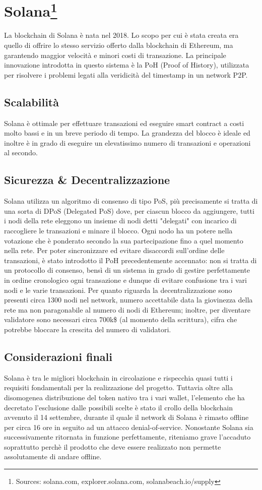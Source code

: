 \documentclass[a4paper, 12pt]{article}
\begin{document}
\newpage
\section*{Solana\footnote{Sources: solana.com, explorer.solana.com, solanabeach.io/supply}}
La blockchain di Solana è nata nel 2018. Lo scopo per cui è stata creata era quello di offrire lo stesso servizio offerto dalla blockchain di Ethereum, ma garantendo maggior velocità e minori costi di transazione. La principale innovazione introdotta in questo sistema è la PoH (Proof of History), utilizzata per risolvere i problemi legati alla veridicità del timestamp in un network P2P.
\subsection*{Scalabilità}
Solana è ottimale per effettuare transazioni ed eseguire smart contract a costi molto bassi e in un breve periodo di tempo. La grandezza del blocco è ideale ed inoltre è in grado di eseguire un elevatissimo numero di transazioni e operazioni al secondo.
\subsection*{Sicurezza \& Decentralizzazione}
Solana utilizza un algoritmo di consenso di tipo PoS, più precisamente si tratta di una sorta di DPoS (Delegated PoS) dove, per ciascun blocco da aggiungere, tutti i nodi della rete eleggono un insieme di nodi detti "delegati" con incarico di raccogliere le transazioni e minare il blocco. Ogni nodo ha un potere nella votazione che è ponderato secondo la sua partecipazione fino a quel momento nella rete. Per poter sincronizzare ed evitare disaccordi sull'ordine delle transazioni, è stato introdotto il PoH precedentemente accennato: non si tratta di un protocollo di consenso, bensì di un sistema in grado di gestire perfettamente in ordine cronologico ogni transazione e dunque di evitare confusione tra i vari nodi e le varie transazioni. Per quanto riguarda la decentralizzazione sono presenti circa 1300 nodi nel network, numero accettabile data la giovinezza della rete ma non paragonabile al numero di nodi di Ethereum; inoltre, per diventare validatore sono necessari circa 700k\$ (al momento della scrittura), cifra che potrebbe bloccare la crescita del numero di validatori.
\subsection*{Considerazioni finali}
Solana è tra le migliori blockchain in circolazione e rispecchia quasi tutti i requisiti fondamentali per la realizzazione del progetto. Tuttavia oltre alla disomogenea distribuzione del token nativo tra i vari wallet, l'elemento che ha decretato l'esclusione dalle possibili scelte è stato il crollo della blockchain avvenuto il 14 settembre, durante il quale il network di Solana è rimasto offline per circa 16 ore in seguito ad un attacco denial-of-service. Nonostante Solana sia successivamente ritornata in funzione perfettamente, riteniamo grave l'accaduto soprattutto perchè il prodotto che deve essere realizzato non permette assolutamente di andare offline.
\newpage
\end{document}
